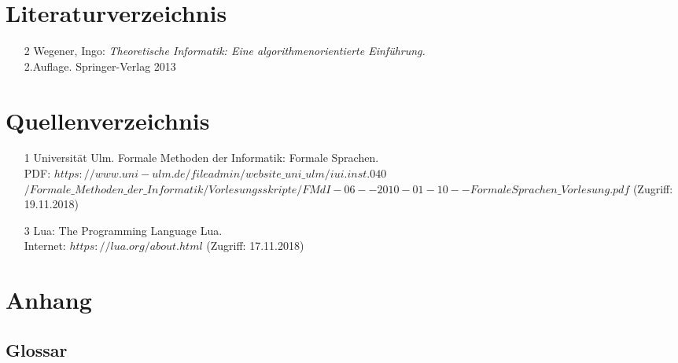 \section*{Literaturverzeichnis}
\begin{itemize}
\item [2] Wegener, Ingo: \textit{Theoretische Informatik: Eine algorithmenorientierte Einführung.}\\ 2.Auflage. Springer-Verlag 2013 


\end{itemize}
\newpage


\section*{Quellenverzeichnis}
\begin{itemize}
\item [1] Universität Ulm. Formale Methoden der Informatik: Formale Sprachen. \\PDF: $https://www.uni-ulm.de/fileadmin/website\_uni\_ulm/iui.inst.040$\\$/Formale\_Methoden\_der\_Informatik/Vorlesungsskripte/FMdI-06--2010-01-10--FormaleSprachen\_Vorlesung.pdf$ (Zugriff: 19.11.2018)

\item [3] Lua: The Programming Language Lua. \\ Internet: $https://lua.org/about.html$ (Zugriff: 17.11.2018) 
\end{itemize}

\newpage
\section*{Anhang}
\subsection*{Glossar}


